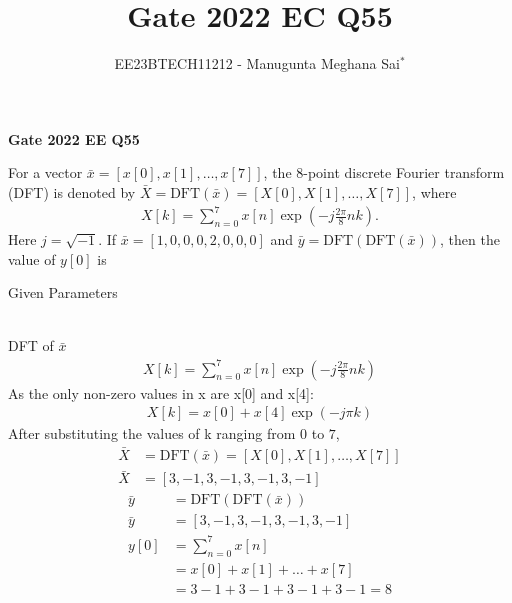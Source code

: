 \documentclass[journal,12pt,onecolumn]{IEEEtran}
\theoremstyle{remark}
\begin{document}
    
    
    \vspace{3cm}
    
    \title{Gate 2022 EC Q55}
    \author{EE23BTECH11212 - Manugunta Meghana Sai$^{*}$%
    }
    \maketitle
    \bigskip
    
    \renewcommand{\thefigure}{\theenumi}
    \renewcommand{\thetable}{\theenumi}
    
    \vspace{3cm}
    \textbf{Gate 2022 EE Q55} 
    
    For a vector $\bar{x} = [x[0], x[1], \dots, x[7] ]$, the $8$-point discrete Fourier transform (DFT) is denoted by $\bar{X} = \text{DFT}(\bar{x}) = [X[0],X[1],\dots,X[7]]$, where
    \begin{align*}
    X[k] = \sum_{n=0}^{7}x[n]\exp\left(-j\frac{2\pi}{8}nk\right).
    \end{align*} 
    Here $j = \sqrt{-1}$. If $\bar{x} = [1,0,0,0,2,0,0,0]$ and $\bar{y} = \text{DFT}(\text{DFT}(\bar{x}))$, then the value of $y[0]$ is\\
    \solution
    \begin{table}[h!]
 	\centering
 	\resizebox{6 cm}{!}{
 		
 	}
 	\caption{Given Parameters}
 	\label{tab:msmECgate55tab1} 
 \end{table} 
    \\DFT of $\bar{x}$
    \begin{align}
    X[k] = \sum_{n=0}^{7}x[n]\exp\left(-j\frac{2\pi}{8}nk\right)
    \end{align}
    As the only non-zero values in x are x[0] and x[4]:
    \begin{align}
    X[k] = x[0] + x[4]\exp\left(-j\pi k\right)
    \end{align}
    After substituting the values of k ranging from $0$ to $7$,
    \begin{align}
    \bar{X} &= \text{DFT}(\bar{x}) = [X[0],X[1],\dots,X[7]]\\
    \bar{X} &= [3,-1,3,-1,3,-1,3,-1]
    \end{align}
    \begin{align}
    \bar{y} &= \text{DFT}(\text{DFT}(\bar{x}))\\
    \bar{y} &= [3,-1,3,-1,3,-1,3,-1]\\
    y[0] &= \sum_{n=0}^{7}x[n]\\
    &= x[0] + x[1] + \dots + x[7]\\
    &= 3 -1 +3 -1 +3 -1 +3 -1 = 8
    \end{align}
\end{document}
